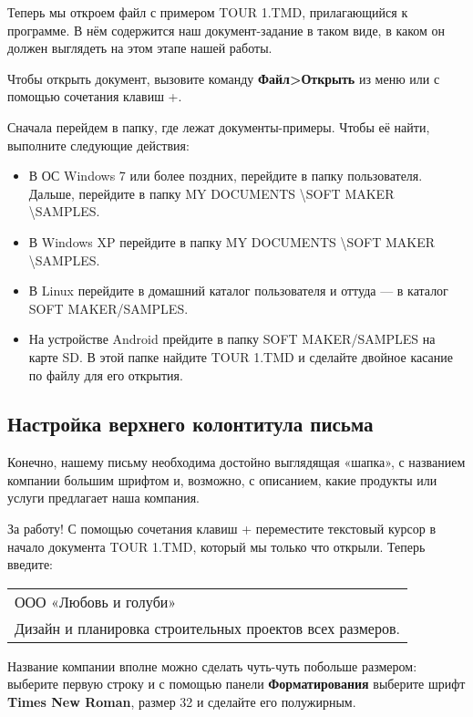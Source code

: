 \documentclass[a4paper,10pt]{article}
\begin{document}
Теперь мы откроем файл с примером TOUR 1.TMD, прилагающийся к программе. В нём содержится наш документ-задание в таком виде, в каком он должен выглядеть на этом этапе нашей работы.

Чтобы открыть документ, вызовите команду \textbf{Файл>Открыть} из меню или с помощью сочетания клавиш +. 

Сначала перейдем в папку, где лежат документы-примеры. Чтобы её найти, выполните следующие действия:
\begin{itemize}
 \item В ОС Windows 7 или более поздних, перейдите в папку пользователя. Дальше, перейдите в папку MY DOCUMENTS \textbackslash SOFT MAKER \textbackslash SAMPLES.
 \item В Windows XP перейдите в папку MY DOCUMENTS \textbackslash SOFT MAKER \textbackslash SAMPLES.
 \item В Linux перейдите в домашний каталог пользователя и оттуда --- в каталог SOFT MAKER/SAMPLES.
 \item На устройстве Android прейдите в папку SOFT MAKER/SAMPLES на карте SD. В этой папке найдите TOUR 1.TMD и сделайте двойное касание по файлу для его открытия.
\end{itemize}

\subsection{Настройка верхнего колонтитула письма}
Конечно, нашему письму необходима достойно выглядящая «шапка», с названием компании большим шрифтом и, возможно, с описанием, какие продукты или услуги предлагает наша компания.

За работу! С помощью сочетания клавиш + переместите текстовый курсор в начало документа TOUR 1.TMD, который мы только что открыли. Теперь введите:

\begin{center}
\begin{tabular}{ | m{15cm} | }
\hline
ООО «Любовь и голуби»\keys{\return} \\
Дизайн и планировка строительных проектов всех размеров. \\
\hline
\end{tabular}
\end{center}

Название компании вполне можно сделать чуть-чуть побольше размером: выберите первую строку и с помощью панели \textbf{Форматирования} выберите шрифт \textbf{Times New Roman}, размер 32 и сделайте его полужирным.
\end{document}
